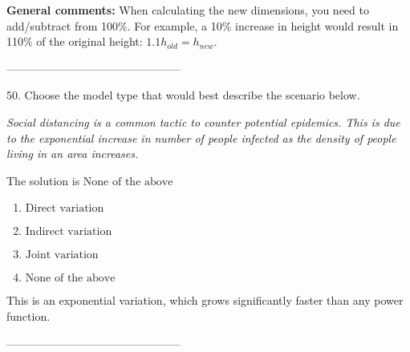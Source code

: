\documentclass{article}[14pt]
\begin{document}
\textbf{General comments:} When calculating the new dimensions, you need to add/subtract from 100\%. For example, a 10\% increase in height would result in 110\% of the original height: $1.1h_{old} = h_{new}$.

-----------------------------------------------

50. Choose the model type that would best describe the scenario below.
\begin{center} \textit{Social distancing is a common tactic to counter potential epidemics. This is due to the exponential increase in number of people infected as the density of people living in an area increases.} \end{center} 
The solution is $ \text{None of the above} $ 

\begin{enumerate}[label=\Alph*.] 
\item $ \text{Direct variation} $ 

  
\item $ \text{Indirect variation} $ 

  
\item $ \text{Joint variation} $ 

  
\item $ \text{None of the above} $ 

  
\end{enumerate} 
 
This is an exponential variation, which grows significantly faster than any power function.

-----------------------------------------------
\end{document}
